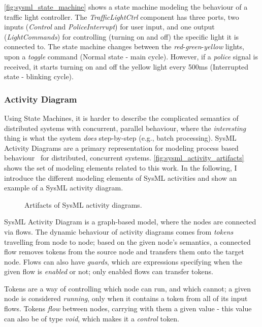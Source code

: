 \autoref{fig:sysml_state_machine} shows a state machine modeling the behaviour of a traffic light controller. The \emph{TrafficLightCtrl} component has three ports, two inputs (\emph{Control} and \emph{PoliceInterrupt}) for user input, and one output (\emph{LightCommands}) for controlling (turning on and off) the specific light it is connected to. The state machine changes between the \emph{red}-\emph{green}-\emph{yellow} lights, upon a \emph{toggle} command (Normal state - main cycle). However, if a \emph{police} signal is received, it starts turning on and off the yellow light every 500ms (Interrupted state - blinking cycle).

\subsubsection*{Activity Diagram}\label{ssec:sysml_activity}

Using State Machines, it is harder to describe the complicated semantics of distributed systems with concurrent, parallel behaviour, where the \emph{interesting} thing is what the system \emph{does} step-by-step (e.g., batch processing). SysML Activity Diagrams are a primary representation for modeling process based behaviour~\cite{omg_sysml} for distributed, concurrent systems. \autoref{fig:sysml_activity_artifacts} shows the set of modeling elements related to this work. In the following, I introduce the different modeling elements of SysML activities and show an example of a SysML activity diagram.

\begin{figure}[!ht]
	\centering
	
	\caption{Artifacts of SysML activity diagrams.}
	\label{fig:sysml_activity_artifacts}
\end{figure}

SysML Activity Diagram is a graph-based model, where the nodes are connected via flows. The dynamic behaviour of activity diagrams comes from \emph{tokens} travelling from node to node; based on the given node's semantics, a connected flow removes tokens from the source node and transfers them onto the target node. Flows can also have \emph{guards}, which are expressions specifying when the given flow is \emph{enabled} or not; only enabled flows can transfer tokens.

Tokens are a way of controlling which node can run, and which cannot; a given node is considered \emph{running}, only when it contains a token from all of its input flows. Tokens \emph{flow} between nodes, carrying with them a given value - this value can also be of type \emph{void}, which makes it a \emph{control} token.

